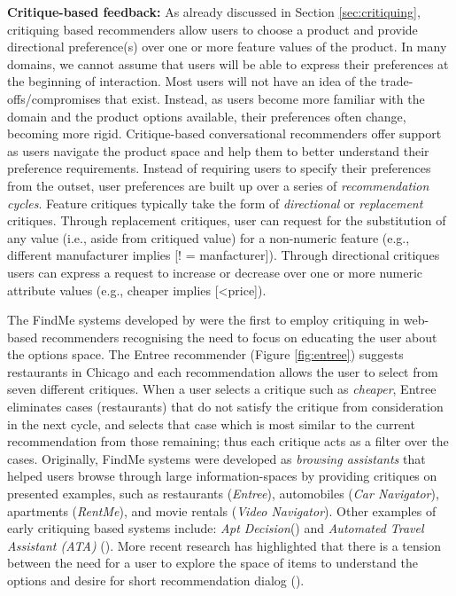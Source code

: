 \textbf{Critique-based feedback:}
As already discussed in Section \ref{sec:critiquing}, critiquing based recommenders allow users to choose a product and provide directional preference(s) over one or more feature values of the product.
In many domains, we cannot assume that users will be able to express their preferences at the beginning of interaction.
 Most users will not have an idea of the trade-offs/compromises that exist.
 Instead, as users become more familiar with the domain and the product options available, their preferences often change, becoming more rigid.
Critique-based conversational recommenders offer support as users navigate the product space and help them to better understand their preference requirements. 
Instead of requiring users to specify their preferences from the outset, user preferences are built up over a series of \textit{recommendation cycles}. 
Feature critiques typically take the form of \textit{directional} or \textit{replacement} critiques. 
Through replacement critiques, user can request for the substitution of any value (i.e., aside from critiqued value) for a non-numeric feature (e.g., different manufacturer implies [! = manfacturer]).
Through directional critiques users can express a request to increase or decrease over one or more numeric attribute values (e.g., cheaper implies [\textless  price]). 

The FindMe systems developed by \cite{burkeEarlierSystems} were the first to employ critiquing in web-based recommenders recognising the need to focus on educating the user about the options space.
The Entree recommender (Figure \ref{fig:entree}) suggests restaurants in Chicago and each recommendation allows the user to select from seven different critiques.
When a user selects a critique such as \textit{cheaper}, Entree eliminates cases (restaurants) that do not satisfy the critique from consideration in the next cycle, and selects that case which is most similar to the current recommendation from those remaining; thus each critique acts as a filter over the cases.
Originally, FindMe systems were developed as \textit{browsing assistants} that helped users browse through large information-spaces by providing critiques on presented examples, such as restaurants (\textit{Entree}), automobiles (\textit{Car Navigator}), apartments (\textit{RentMe}), and movie rentals (\textit{Video Navigator}).
Other examples of early critiquing based systems include: \textit{Apt Decision}(\cite{aptDecision}) and \textit{Automated Travel Assistant (ATA)} (\cite{ata}).
More recent research has highlighted that there is a tension between the need for a user to explore the space of items to understand the options and desire for short recommendation dialog (\cite{mcginty11}).


